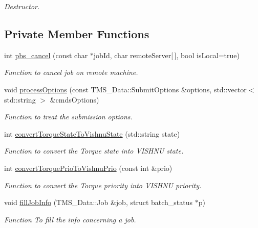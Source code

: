 \begin{DoxyCompactItemize}
\begin{DoxyCompactList}\small\item\em Destructor. \item\end{DoxyCompactList}\end{DoxyCompactItemize}
\subsection*{Private Member Functions}
\begin{DoxyCompactItemize}
\item 
int \hyperlink{classTorqueServer_a8f155d04ceea433de756c98225c053b8}{pbs\_\-cancel} (const char $\ast$jobId, char remoteServer\mbox{[}$\,$\mbox{]}, bool isLocal=true)
\begin{DoxyCompactList}\small\item\em Function to cancel job on remote machine. \item\end{DoxyCompactList}\item 
void \hyperlink{classTorqueServer_a71cd2623e75c3615f16766204f8ef37b}{processOptions} (const TMS\_\-Data::SubmitOptions \&options, std::vector$<$ std::string $>$ \&cmdsOptions)
\begin{DoxyCompactList}\small\item\em Function to treat the submission options. \item\end{DoxyCompactList}\item 
int \hyperlink{classTorqueServer_a5fb51c751187a2bd49598aee2b0e3b18}{convertTorqueStateToVishnuState} (std::string state)
\begin{DoxyCompactList}\small\item\em Function to convert the Torque state into VISHNU state. \item\end{DoxyCompactList}\item 
int \hyperlink{classTorqueServer_a2427d2d3c69cf28f779d22396383e4d4}{convertTorquePrioToVishnuPrio} (const int \&prio)
\begin{DoxyCompactList}\small\item\em Function to convert the Torque priority into VISHNU priority. \item\end{DoxyCompactList}\item 
void \hyperlink{classTorqueServer_a0411b4c5d842efabc66e9a5db39cceba}{fillJobInfo} (TMS\_\-Data::Job \&job, struct batch\_\-status $\ast$p)
\begin{DoxyCompactList}\small\item\em Function To fill the info concerning a job. \item\end{DoxyCompactList}\end{DoxyCompactItemize}
